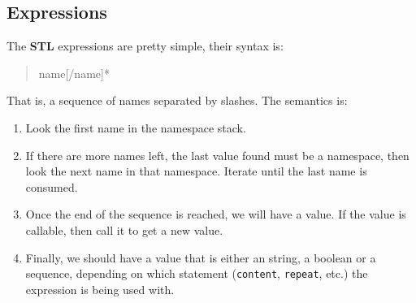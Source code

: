 \subsection{Expressions}

The {\bf STL} expressions are pretty simple, their syntax is:

\begin{quote}
    name[/name]*
\end{quote}

That is, a sequence of names separated by slashes. The semantics is:

\begin{enumerate}
  \item Look the first name in the namespace stack.

  \item If there are more names left, the last value found must be a namespace,
    then look the next name in that namespace. Iterate until the last name
    is consumed.

  \item Once the end of the sequence is reached, we will have a value. If
    the value is callable, then call it to get a new value.

  \item Finally, we should have a value that is either an string, a boolean
    or a sequence, depending on which statement ({\tt content}, {\tt repeat},
    etc.) the expression is being used with.
\end{enumerate}



